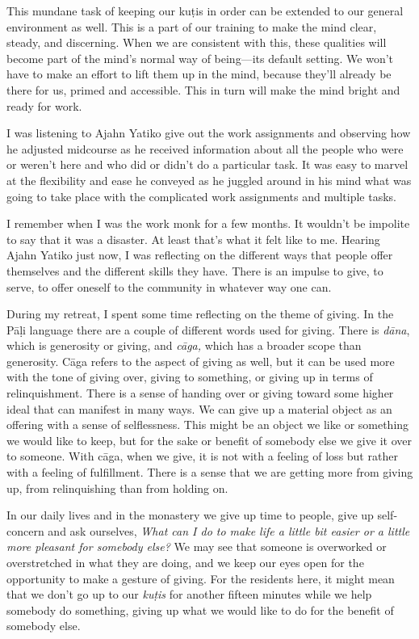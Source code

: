 This mundane task of keeping our kuṭis in order can be extended to 
our general environment as well. This is a part of our training to make 
the mind clear, steady, and discerning. When we are consistent with 
this, these qualities will become part of the mind's normal way of 
being---its default setting. We won't have to make an effort to lift 
them up in the mind, because they'll already be there for us, primed 
and accessible. This in turn will make the mind bright and ready for 
work.


I was listening to Ajahn Yatiko give out the work assignments and 
observing how he adjusted midcourse as he received information about 
all the people who were or weren't here and who did or didn't do a 
particular task. It was easy to marvel at the flexibility and ease he 
conveyed as he juggled around in his mind what was going to take place 
with the complicated work assignments and multiple tasks.

I remember when I was the work monk for a few months. It wouldn't be 
impolite to say that it was a disaster. At least that's what it felt 
like to me. Hearing Ajahn Yatiko just now, I was reflecting on the 
different ways that people offer themselves and the different skills 
they have. There is an impulse to give, to serve, to offer oneself to 
the community in whatever way one can.

During my retreat, I spent some time reflecting on the theme of giving. 
In the Pāḷi language there are a couple of different words used for 
giving. There is \emph{dāna}, which is generosity or giving, and 
\emph{cāga,} which has a broader scope than generosity. Cāga refers 
to the aspect of giving as well, but it can be used more with the tone 
of giving over, giving to something, or giving up in terms of 
relinquishment. There is a sense of handing over or giving toward some 
higher ideal that can manifest in many ways. We can give up a material 
object as an offering with a sense of selflessness. This might be an 
object we like or something we would like to keep, but for the sake or 
benefit of somebody else we give it over to someone. With cāga, when 
we give, it is not with a feeling of loss but rather with a feeling of 
fulfillment. There is a sense that we are getting more from giving up, 
from relinquishing than from holding on.

In our daily lives and in the monastery we give up time to people, give 
up self-concern and ask ourselves, \emph{What can I do to make life a 
little bit easier or a little more pleasant for somebody else?} We may 
see that someone is overworked or overstretched in what they are doing, 
and we keep our eyes open for the opportunity to make a gesture of 
giving. For the residents here, it might mean that we don't go up to 
our \emph{kuṭis} for another fifteen minutes while we help somebody 
do something, giving up what we would like to do for the benefit of 
somebody else.

